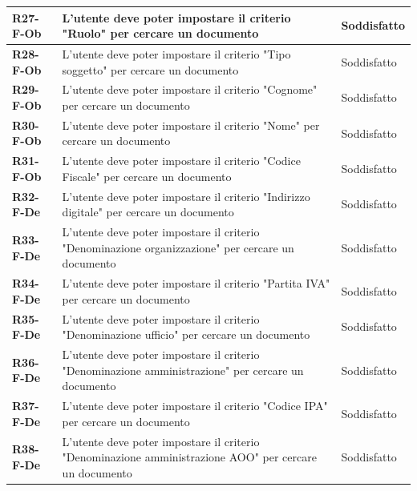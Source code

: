 \documentclass[a4paper,12pt]{article}
\begin{document}
{{{\begin{longtable}{|>{\centering\arraybackslash}m{}|>{\centering\arraybackslash}m{}|>{\centering\arraybackslash}m{}|}
                \hline
                \textbf{R27-F-Ob} & L'utente deve poter impostare il criterio "Ruolo" per cercare un documento & 
                Soddisfatto \\ 
                \hline
                \textbf{R28-F-Ob} & L'utente deve poter impostare il criterio "Tipo soggetto" per cercare un documento & 
                Soddisfatto \\ 
                \hline
                \textbf{R29-F-Ob} & L'utente deve poter impostare il criterio "Cognome" per cercare un documento & 
                Soddisfatto \\ 
                \hline
                \textbf{R30-F-Ob} & L'utente deve poter impostare il criterio "Nome" per cercare un documento & 
                Soddisfatto \\ 
                \hline
                \textbf{R31-F-Ob} & L'utente deve poter impostare il criterio "Codice Fiscale" per cercare un documento & 
                Soddisfatto \\ 
                \hline
                \textbf{R32-F-De} & L'utente deve poter impostare il criterio "Indirizzo digitale" per cercare un documento & 
                Soddisfatto \\ 
                \hline
                \textbf{R33-F-De} & L'utente deve poter impostare il criterio "Denominazione organizzazione" per cercare un documento & 
                Soddisfatto \\ 
                \hline
                \textbf{R34-F-De} & L'utente deve poter impostare il criterio "Partita IVA" per cercare un documento & 
                Soddisfatto \\ 
                \hline
                \textbf{R35-F-De} & L'utente deve poter impostare il criterio "Denominazione ufficio" per cercare un documento & 
                Soddisfatto \\ 
                \hline
                \textbf{R36-F-De} & L'utente deve poter impostare il criterio "Denominazione amministrazione" per cercare un documento & 
                Soddisfatto \\
                \hline
                \textbf{R37-F-De} & L'utente deve poter impostare il criterio "Codice IPA" per cercare un documento & 
                Soddisfatto \\
                \hline
                \textbf{R38-F-De} & L'utente deve poter impostare il criterio "Denominazione amministrazione AOO" per cercare un documento & 
                Soddisfatto \\

\end{longtable}}}}
\end{document}
